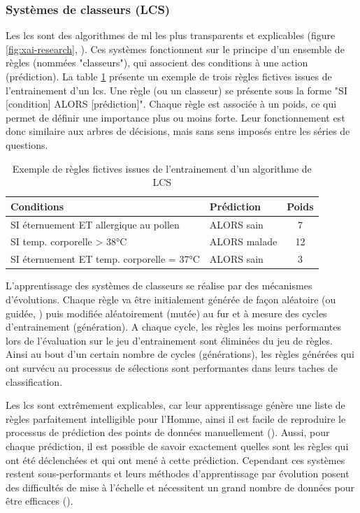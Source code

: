 \subsubsection{Systèmes de classeurs (LCS)}
Les \gls{lcs} sont des algorithmes de \gls{ml} les plus transparents et explicables (figure \ref{fig:xai-research}, \cite{arrieta_explainable_2019}). Ces systèmes fonctionnent sur le principe d'un ensemble de règles (nommées "classeurs"), qui associent des conditions à une action (prédiction). La table \ref{table:lcs-rules} présente un exemple de trois règles fictives issues de l'entrainement d'un \gls{lcs}. Une règle (ou un classeur) se présente sous la forme "SI [condition] ALORS [prédiction]". Chaque règle est associée à un poids, ce qui permet de définir une importance plus ou moins forte. Leur fonctionnement est donc similaire aux arbres de décisions, mais sans sens imposés entre les séries de questions.
\begin{table}[!htbp]
\centering
\begin{tabular}{|l|l|c|} 
 \hline
 Conditions & Prédiction & Poids \\
 \hline
 SI éternuement ET allergique au pollen & ALORS sain & 7 \\ 
 SI temp. corporelle > 38°C & ALORS malade & 12  \\ 
 SI éternuement ET temp. corporelle = 37°C & ALORS sain & 3  \\ 

 \hline
\end{tabular}
\caption{Exemple de règles fictives issues de l'entrainement d'un algorithme de LCS}
\label{table:lcs-rules}
\end{table}

L'apprentissage des systèmes de classeurs se réalise par des mécanismes d'évolutions. Chaque règle va être initialement générée de façon aléatoire (ou guidée, \cite{urbanowicz_relief-based_2018}) puis modifiée aléatoirement (mutée) au fur et à mesure des cycles d'entrainement (génération). A chaque cycle, les règles les moins performantes lors de l'évaluation sur le jeu d'entrainement sont éliminées du jeu de règles. Ainsi au bout d'un certain nombre de cycles (générations), les règles générées qui ont survécu au processus de sélections sont performantes dans leurs taches de classification.

Les \gls{lcs} sont extrêmement explicables, car leur apprentissage génère une liste de règles parfaitement intelligible pour l'Homme, ainsi il est facile de reproduire le processus de prédiction des points de données manuellement (\cite{arrieta_explainable_2019}). Aussi, pour chaque prédiction, il est possible de savoir exactement quelles sont les règles qui ont été déclenchées et qui ont mené à cette prédiction. Cependant ces systèmes restent sous-performants et leurs méthodes d'apprentissage par évolution posent des difficultés de mise à l'échelle et nécessitent un grand nombre de données pour être efficaces (\cite{urbanowicz_exstracs_2015}).

